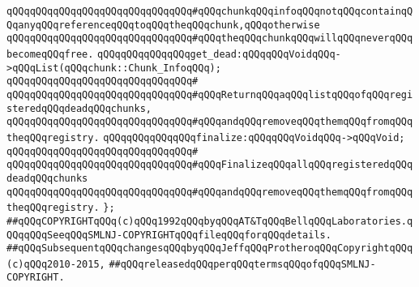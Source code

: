 \verb|qQQqqQQqqQQqqQQqqQQqqQQqqQQqqQQq#qQQqchunkqQQqinfoqQQqnotqQQqcontainqQQqanyqQQqreferenceqQQqtoqQQqtheqQQqchunk,qQQqotherwise|\newline
\verb|qQQqqQQqqQQqqQQqqQQqqQQqqQQqqQQq#qQQqtheqQQqchunkqQQqwillqQQqneverqQQqbecomeqQQqfree.|\newline
\newline
\newline
\verb|qQQqqQQqqQQqqQQqget_dead:qQQqqQQqVoidqQQq->qQQqList(qQQqchunk::Chunk_InfoqQQq);|\newline
\verb|qQQqqQQqqQQqqQQqqQQqqQQqqQQqqQQq#|\newline
\verb|qQQqqQQqqQQqqQQqqQQqqQQqqQQqqQQq#qQQqReturnqQQqaqQQqlistqQQqofqQQqregisteredqQQqdeadqQQqchunks,|\newline
\verb|qQQqqQQqqQQqqQQqqQQqqQQqqQQqqQQq#qQQqandqQQqremoveqQQqthemqQQqfromqQQqtheqQQqregistry.|\newline
\newline
\newline
\verb|qQQqqQQqqQQqqQQqfinalize:qQQqqQQqVoidqQQq->qQQqVoid;|\newline
\verb|qQQqqQQqqQQqqQQqqQQqqQQqqQQqqQQq#|\newline
\verb|qQQqqQQqqQQqqQQqqQQqqQQqqQQqqQQq#qQQqFinalizeqQQqallqQQqregisteredqQQqdeadqQQqchunks|\newline
\verb|qQQqqQQqqQQqqQQqqQQqqQQqqQQqqQQq#qQQqandqQQqremoveqQQqthemqQQqfromqQQqtheqQQqregistry.|\newline
\verb|};|\newline
\newline
\newline
\newline
\verb|##qQQqCOPYRIGHTqQQq(c)qQQq1992qQQqbyqQQqAT&TqQQqBellqQQqLaboratories.qQQqqQQqSeeqQQqSMLNJ-COPYRIGHTqQQqfileqQQqforqQQqdetails.|\newline
\verb|##qQQqSubsequentqQQqchangesqQQqbyqQQqJeffqQQqProtheroqQQqCopyrightqQQq(c)qQQq2010-2015,|\newline
\verb|##qQQqreleasedqQQqperqQQqtermsqQQqofqQQqSMLNJ-COPYRIGHT.|\newline

